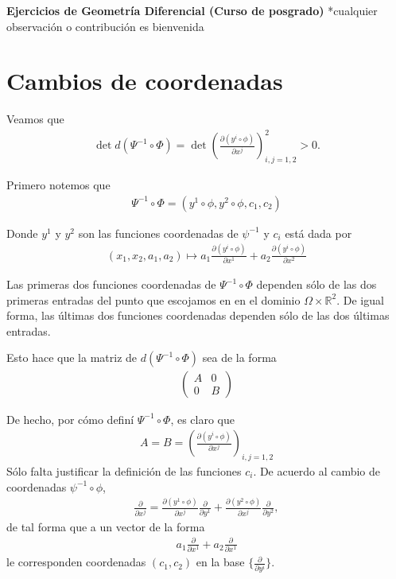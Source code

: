 \documentclass[11pt]{article}
\theoremstyle{definition}
\begin{document}
\setcounter{section}{0}
\title{}

\thispagestyle{empty}

\begin{center}
{\Large \bf Ejercicios de Geometría Diferencial (Curso de posgrado)}
*cualquier observación o contribución es bienvenida
\end{center}
\section*{Cambios de coordenadas}

Veamos que
\begin{align*}
\det d(\Psi^{-1}\circ\Phi)= \det \left(\frac{\partial (y^i\circ \phi)}{\partial x^j}\right)_{i,j=1,2}^2 > 0.
\end{align*}

Primero notemos que 
\begin{align*}
\Psi^{-1}\circ\Phi=(y^1\circ\phi,y^2\circ\phi,c_1,c_2)
\end{align*}
\par Donde $y^1$ y $y^2$ son las funciones coordenadas de $\psi^{-1}$ y $c_i$ está dada por
\begin{align*}
(x_1,x_2,a_1,a_2)\mapsto a_1\frac{\partial (y^i\circ \phi)}{\partial x^1}+a_2\frac{\partial (y^i\circ \phi)}{\partial x^2}
\end{align*}
\par Las primeras dos funciones coordenadas de $\Psi^{-1}\circ\Phi$ dependen sólo de las dos primeras entradas del punto que escojamos en en el dominio $\Omega\times\mathbb{R}^2$. De igual forma, las últimas dos funciones coordenadas dependen sólo de las dos últimas entradas.\par
Esto hace que la matriz de $d(\Psi^{-1}\circ\Phi)$ sea de la forma 
\begin{align*}
\begin{pmatrix}
A & 0 \\
0 & B
\end{pmatrix}
\end{align*}
\par De hecho, por cómo definí $\Psi^{-1}\circ\Phi$, es claro que
\begin{align*}
A=B=\left(\frac{\partial (y^i\circ \phi)}{\partial x^j}\right)_{i,j=1,2}
\end{align*}
Sólo falta justificar la definición de las funciones $c_i$. De acuerdo al cambio de coordenadas $\psi^{-1}\circ\phi$,
\begin{align*}
\frac{\partial}{\partial x^j}=\frac{\partial (y^1\circ \phi)}{\partial x^j}\frac{\partial}{\partial y^1}+\frac{\partial (y^2\circ \phi)}{\partial x^j}\frac{\partial}{\partial y^2},
\end{align*}
de tal forma que a un vector de la forma
\begin{align*}
 a_1\frac{\partial}{\partial x^1}+a_2\frac{\partial}{\partial x^1}
\end{align*}
le corresponden coordenadas $(c_1,c_2)$ en la base $\big\{ \frac{\partial}{\partial y^i}\big\}$.
\newpage
\end{document}
